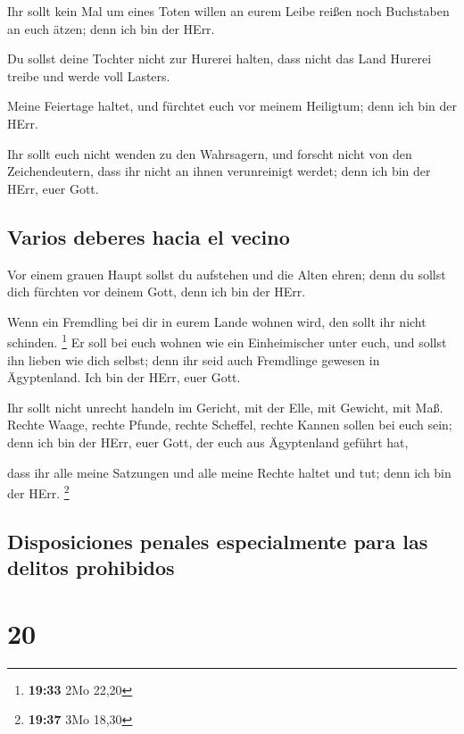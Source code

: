  Ihr sollt kein Mal um eines Toten willen an eurem Leibe
reißen noch Buchstaben an euch ätzen; denn ich bin der HErr.

 Du sollst deine Tochter nicht zur Hurerei halten, dass
nicht das Land Hurerei treibe und werde voll Lasters.

 Meine Feiertage haltet, und fürchtet euch vor meinem
Heiligtum; denn ich bin der HErr.

 Ihr sollt euch nicht wenden zu den Wahrsagern, und
forscht nicht von den Zeichendeutern, dass ihr nicht an ihnen
verunreinigt werdet; denn ich bin der HErr, euer Gott.

\hypertarget{varios-deberes-hacia-el-vecino}{%
\subsection{Varios deberes hacia el
vecino}\label{varios-deberes-hacia-el-vecino}}

 Vor einem grauen Haupt sollst du aufstehen und die Alten
ehren; denn du sollst dich fürchten vor deinem Gott, denn ich bin der
HErr.

 Wenn ein Fremdling bei dir in eurem Lande wohnen wird,
den sollt ihr nicht schinden. \footnote{\textbf{19:33} 2Mo 22,20}
 Er soll bei euch wohnen wie ein Einheimischer unter
euch, und sollst ihn lieben wie dich selbst; denn ihr seid auch
Fremdlinge gewesen in Ägyptenland. Ich bin der HErr, euer Gott.

 Ihr sollt nicht unrecht handeln im Gericht, mit der
Elle, mit Gewicht, mit Maß.  Rechte Waage, rechte Pfunde,
rechte Scheffel, rechte Kannen sollen bei euch sein; denn ich bin der
HErr, euer Gott, der euch aus Ägyptenland geführt hat,

 dass ihr alle meine Satzungen und alle meine Rechte
haltet und tut; denn ich bin der HErr. \footnote{\textbf{19:37} 3Mo
  18,30}

\hypertarget{disposiciones-penales-especialmente-para-las-delitos-prohibidos}{%
\subsection{Disposiciones penales especialmente para las delitos
prohibidos}\label{disposiciones-penales-especialmente-para-las-delitos-prohibidos}}

\hypertarget{section-19}{%
\section{20}\label{section-19}}

